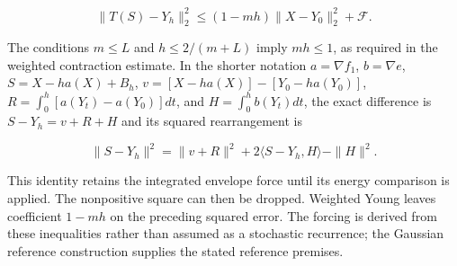 \documentclass[11pt,a4paper]{report}
\begin{document}
\[\|T(S)-Y_h\|_2^2\le(1-mh)\|X-Y_0\|_2^2+\mathcal F.\]

The conditions \(m\le L\) and \(h\le2/(m+L)\) imply \(mh\le1\), as required in the weighted contraction estimate. In the shorter notation \(a=\nabla f_1\), \(b=\nabla e\), \(S=X-ha(X)+B_h\), \(v=[X-ha(X)]-[Y_0-ha(Y_0)]\), \(R=\int_0^h[a(Y_t)-a(Y_0)]dt\), and \(H=\int_0^h b(Y_t)dt\), the exact difference is \(S-Y_h=v+R+H\) and its squared rearrangement is

\[\|S-Y_h\|^2=\|v+R\|^2+2\langle S-Y_h,H\rangle-\|H\|^2.\]

This identity retains the integrated envelope force until its energy comparison is applied. The nonpositive square can then be dropped. Weighted Young leaves coefficient \(1-mh\) on the preceding squared error. The forcing is derived from these inequalities rather than assumed as a stochastic recurrence; the Gaussian reference construction supplies the stated reference premises.
\end{document}

